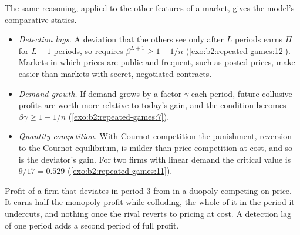 The same reasoning, applied to the other features of a market, gives the model's comparative statics.
\begin{itemize}
  \item \emph{Detection lags.} A deviation that the others see only after $L$ periods earns $\Pi$ for $L + 1$ periods, so
     requires $\beta^{L + 1} \ge 1 - 1/n$ (\cref{exo:b2:repeated-games:12}). Markets in which prices are public and
    frequent, such as posted prices, make  easier than markets with secret, negotiated contracts.
  \item \emph{Demand growth.} If demand grows by a factor $\gamma$ each period, future collusive profits are worth more
    relative to today's gain, and the condition becomes $\beta\gamma \ge 1 - 1/n$ (\cref{exo:b2:repeated-games:7}).
  \item \emph{Quantity competition.} With Cournot competition the punishment, reversion to the Cournot
    equilibrium, is milder than price competition at cost, and so is the deviator's gain. For two firms with
    linear demand the critical value is $9/17 = 0.529$ (\cref{exo:b2:repeated-games:11}).
\end{itemize}

\begin{omfigure}

{\small Profit of a firm that deviates in period 3 from  in a duopoly competing on price. It earns half
the monopoly profit while colluding, the whole of it in the period it undercuts, and nothing once the rival
reverts to pricing at cost. A detection lag of one period adds a second period of full profit.}
\end{omfigure}

